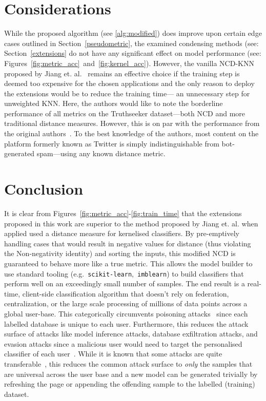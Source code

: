 \documentclass[conference]{IEEEtran}
\begin{document}
\section{Considerations}
\label{considerations}
While the proposed algorithm (see \ref{alg:modified}) does improve upon certain edge cases outlined in Section~\ref{pseudometric}, the examined condensing methods (see: Section~\ref{extensions} do not have any significant effect on model performance (see: Figures~\ref{fig:metric_acc}~and~\ref{fig:kernel_acc}). 
However, the vanilla NCD-KNN proposed by Jiang et. al.~\cite{jiang2022less} remains an effective choice if the training step is deemed too expensive for the chosen applications and the only reason to deploy the extensions would be to reduce the training time--- an unnecessary step for unweighted KNN. 
Here, the authors would like to note the borderline performance of all metrics on the Truthseeker dataset---both NCD and more traditional distance measures. However, this is on par with the performance from the original authors~\cite{truthseeker}. To the best knowledge of the authors, most content on the platform formerly known as Twitter is simply indistinguishable from bot-generated spam---using any known distance metric.


\section{Conclusion}
\label{conclusion}

It is clear from Figures~\ref{fig:metric_acc}-\ref{fig:train_time} that the extensions proposed in this work are superior to the method proposed by Jiang et. al. when applied used a distance measure for kernelised classifiers. 
By pre-emptively handling cases that would result in negative values for distance (thus violating the Non-negativity identity) and sorting the inputs, this modified NCD is guaranteed to behave more like a true metric. 
This allows the model builder to use standard tooling (e.g.~\texttt{scikit-learn},~\texttt{imblearn}) to build classifiers that perform well on an exceedingly small number of samples. The end result is a real-time, client-side classification algorithm that doesn't rely on federation, centralization, or the large scale processing of millions of data points across a global user-base. 
This categorically circumvents poisoning attacks~\cite{biggio_poisoning_2013} since each labelled database is unique to each user. 
Furthermore, this reduces the attack surface of attacks like model inference attacks, database exfiltration attacks, and evasion attacks since a malicious user would need to target the personalised classifier of each user~\cite{biggio_evasion_2013,deepfool,chakraborty_adversarial_2018}. 
While it is known that some attacks are quite transferable~\cite{wang2021enhancing}, this reduces the common attack surface to \textit{only} the samples that are universal across the user base and a new model can be generated trivially by refreshing the page or appending the offending sample to the labelled (training) dataset. 





\newpage

\end{document}
